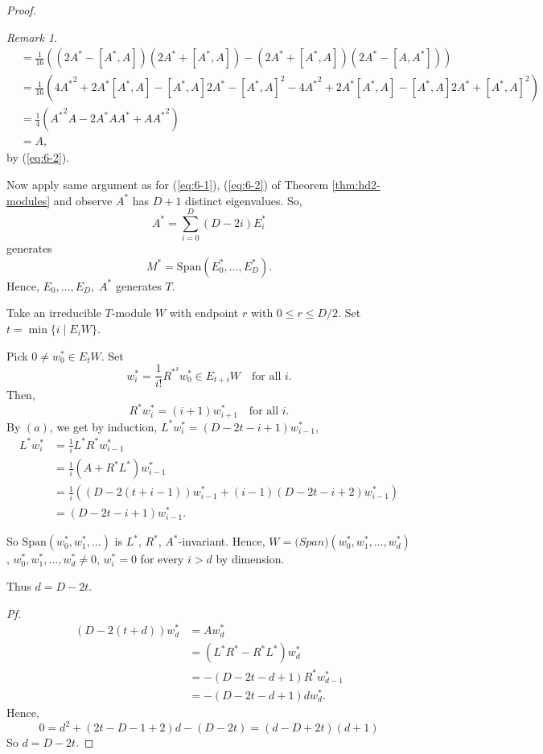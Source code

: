 \documentclass[
]{book}
\theoremstyle{definition}
\theoremstyle{definition}
\theoremstyle{definition}
\theoremstyle{definition}
\theoremstyle{remark}
\newtheorem*{remark}{Remark}
\begin{document}
\begin{proof}
\begin{remark}
\begin{align}
[L^*,R^*] & = \frac{1}{16}((2A^*-[A^*,A])(2A^*+[A^*,A]) - (2A^*+[A^*,A])(2A^*- [A,A^*]))\\
& = \frac{1}{16}(4{A^*}^2 + 2A^*[A^*,A] - [A^*,A]2A^* - [A^*,A]^2 - 4{A^*}^2 + 2A^*[A^*,A] - [A^*,A]2A^* + [A^*,A]^2)\\
& = \frac{1}{4}({A^*}^2A - 2A^*AA^* + A{A^*}^2)\\
& = A,
\end{align}
by (\eqref{eq:6-2}).
\end{remark}

Now apply same argument as for (\eqref{eq:6-1}), (\eqref{eq:6-2}) of Theorem \ref{thm:hd2-modules} and observe \(A^*\) has \(D+1\) distinct eigenvalues. So,
\[A^* = \sum_{i=0}^D(D-2i)E^*_i\]
generates
\[M^* = \mathrm{Span}(E^*_0, \ldots, E^*_D).\]
Hence, \(E_0, \ldots, E_D, \; A^*\) generates \(T\).

Take an irreducible \(T\)-module \(W\) with endpoint \(r\) with \(0\leq r \leq D/2\). Set
\(t = \min\{i\mid E_iW\}\).

Pick \(0\neq w_0^*\in E_tW\). Set
\[w_i^* = \frac{1}{i!}{R^*}^i w_0^* \in E_{t+i}W \quad \text{for all }i.\]
Then,
\[R^*w_i^* = (i+1)w_{i+1}^* \quad \text{for all }i.\]
By \((a)\), we get by induction, \(L^*w_i^* = (D-2t-i+1)w^*_{i-1}\),
\begin{align}
L^*w_i^* & = \frac{1}{i}L^*R^*w_{i-1}^* \\
& = \frac{1}{i}(A + R^*L^*)w_{i-1}^* \\
& = \frac{1}{i}((D-2(t+i-1))w^*_{i-1} + (i-1)(D-2t-i+2)w_{i-1}^*)\\
& = (D-2t - i + 1)w_{i-1}^*.
\end{align}

So \(\mathrm{Span}(w_0^*, w_1^*, \ldots )\) is \(L^*\), \(R^*\), \(A^*\)-invariant. Hence,
\(W = \mathrm(Span)(w_0^*, w_1^*, \ldots, w_d^*)\), \(w_0^*, w_1^*, \ldots, w_d^* \neq 0\), \(w^*_i = 0\) for every \(i>d\) by dimension.

Thus \(d = D-2t\).

\emph{Pf.}
\begin{align}
(D -2(t+d))w^*_d & = Aw_d^* \\
& = (L^*R^* - R^*L^*)w_d^*\\
& = -(D-2t - d + 1)R^*w_{d-1}^*\\
& = -(D-2t - d +1)dw^*_d.
\end{align}
Hence,
\[0 = d^2 + (2t - D - 1 + 2)d - (D-2t) = (d-D+2t)(d+1)\]
So \(d = D-2t\).
\end{proof}
\end{document}
